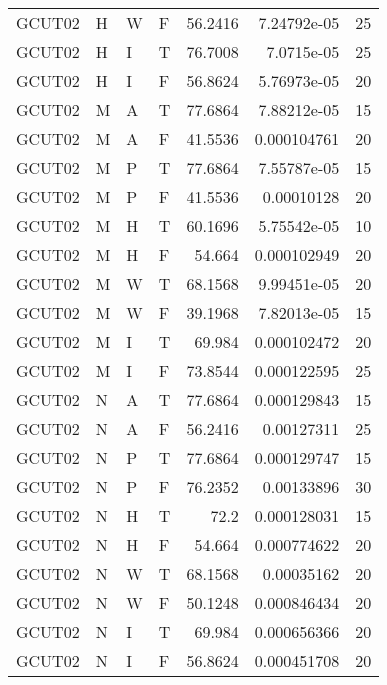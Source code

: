 \begin{table}[!htb]
{\begin{tabular}{llllrrr}
            GCUT02   & H     & W     & F          & 56.2416    & 7.24792e-05 & 25       \\
            GCUT02   & H     & I     & T          & 76.7008    & 7.0715e-05  & 25       \\
            GCUT02   & H     & I     & F          & 56.8624    & 5.76973e-05 & 20       \\
            GCUT02   & M     & A     & T          & 77.6864    & 7.88212e-05 & 15       \\
            GCUT02   & M     & A     & F          & 41.5536    & 0.000104761 & 20       \\
            GCUT02   & M     & P     & T          & 77.6864    & 7.55787e-05 & 15       \\
            GCUT02   & M     & P     & F          & 41.5536    & 0.00010128  & 20       \\
            GCUT02   & M     & H     & T          & 60.1696    & 5.75542e-05 & 10       \\
            GCUT02   & M     & H     & F          & 54.664     & 0.000102949 & 20       \\
            GCUT02   & M     & W     & T          & 68.1568    & 9.99451e-05 & 20       \\
            GCUT02   & M     & W     & F          & 39.1968    & 7.82013e-05 & 15       \\
            GCUT02   & M     & I     & T          & 69.984     & 0.000102472 & 20       \\
            GCUT02   & M     & I     & F          & 73.8544    & 0.000122595 & 25       \\
            GCUT02   & N     & A     & T          & 77.6864    & 0.000129843 & 15       \\
            GCUT02   & N     & A     & F          & 56.2416    & 0.00127311  & 25       \\
            GCUT02   & N     & P     & T          & 77.6864    & 0.000129747 & 15       \\
            GCUT02   & N     & P     & F          & 76.2352    & 0.00133896  & 30       \\
            GCUT02   & N     & H     & T          & 72.2       & 0.000128031 & 15       \\
            GCUT02   & N     & H     & F          & 54.664     & 0.000774622 & 20       \\
            GCUT02   & N     & W     & T          & 68.1568    & 0.00035162  & 20       \\
            GCUT02   & N     & W     & F          & 50.1248    & 0.000846434 & 20       \\
            GCUT02   & N     & I     & T          & 69.984     & 0.000656366 & 20       \\
            GCUT02   & N     & I     & F          & 56.8624    & 0.000451708 & 20       \\
            \hline
        \end{tabular}
    }{}
\end{table}